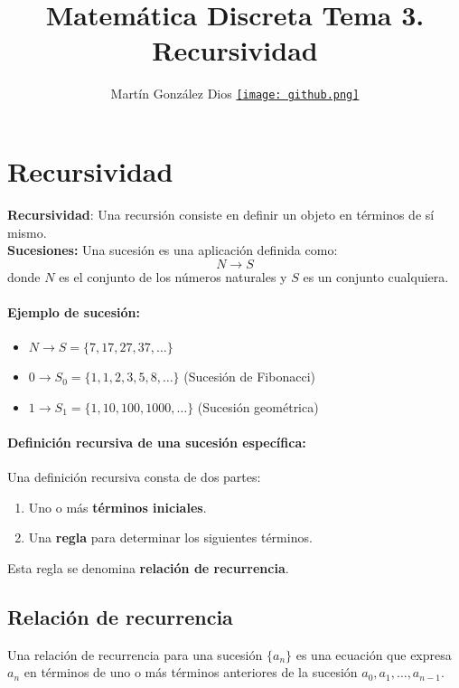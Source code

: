 \documentclass{article}
\title{Matemática Discreta Tema 3. Recursividad}
\author{Martín González Dios 
\href{https://github.com/martindios}{\texttt{[image: github.png]}}}
\begin{document}
\maketitle

\section{Recursividad}

\textbf{Recursividad}: Una recursión consiste en definir un objeto en términos de sí mismo. \\

\textbf{Sucesiones:} Una sucesión es una aplicación definida como: 
\[
N \rightarrow S
\]
donde $N$ es el conjunto de los números naturales y $S$ es un conjunto cualquiera.

\paragraph{Ejemplo de sucesión:}
\begin{itemize}
    \item $N \rightarrow S = \{7, 17, 27, 37, \dots\}$
    \item $0 \rightarrow S_0 = \{1, 1, 2, 3, 5, 8, \dots\}$ (Sucesión de Fibonacci)
    \item $1 \rightarrow S_1 = \{1, 10, 100, 1000, \dots\}$ (Sucesión geométrica)
\end{itemize}

\paragraph{Definición recursiva de una sucesión específica:}
Una definición recursiva consta de dos partes:
\begin{enumerate}
    \item Uno o más \textbf{términos iniciales}.
    \item Una \textbf{regla} para determinar los siguientes términos.
\end{enumerate}
Esta regla se denomina \textbf{relación de recurrencia}.

\subsection{Relación de recurrencia}
Una relación de recurrencia para una sucesión $\{a_n\}$ es una ecuación que expresa $a_n$ en términos de uno o más términos anteriores de la sucesión $a_0, a_1, \dots, a_{n-1}$. 
\end{document}
